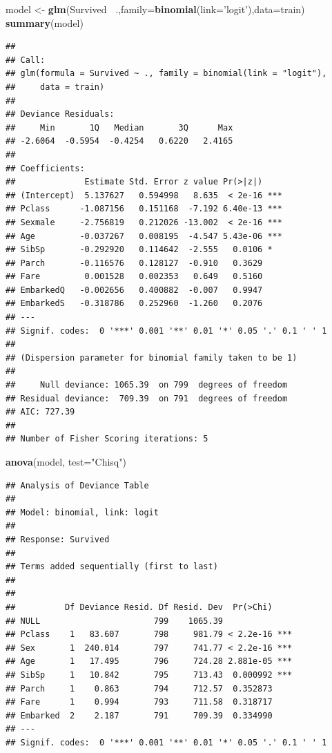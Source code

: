 \documentclass[]{book}
\newenvironment{Shaded}{\begin{snugshade}}{\end{snugshade}}
\newcommand{\KeywordTok}[1]{\textcolor[rgb]{0.13,0.29,0.53}{\textbf{#1}}}
\newcommand{\DataTypeTok}[1]{\textcolor[rgb]{0.13,0.29,0.53}{#1}}
\newcommand{\StringTok}[1]{\textcolor[rgb]{0.31,0.60,0.02}{#1}}
\newcommand{\OperatorTok}[1]{\textcolor[rgb]{0.81,0.36,0.00}{\textbf{#1}}}
\newcommand{\NormalTok}[1]{#1}
\begin{document}
\begin{Shaded}
\begin{Highlighting}[]
\NormalTok{model <-}\StringTok{ }\KeywordTok{glm}\NormalTok{(Survived }\OperatorTok{~}\NormalTok{.,}\DataTypeTok{family=}\KeywordTok{binomial}\NormalTok{(}\DataTypeTok{link=}\StringTok{'logit'}\NormalTok{),}\DataTypeTok{data=}\NormalTok{train)}
\KeywordTok{summary}\NormalTok{(model)}
\end{Highlighting}
\end{Shaded}

\begin{verbatim}
## 
## Call:
## glm(formula = Survived ~ ., family = binomial(link = "logit"), 
##     data = train)
## 
## Deviance Residuals: 
##     Min       1Q   Median       3Q      Max  
## -2.6064  -0.5954  -0.4254   0.6220   2.4165  
## 
## Coefficients:
##              Estimate Std. Error z value Pr(>|z|)    
## (Intercept)  5.137627   0.594998   8.635  < 2e-16 ***
## Pclass      -1.087156   0.151168  -7.192 6.40e-13 ***
## Sexmale     -2.756819   0.212026 -13.002  < 2e-16 ***
## Age         -0.037267   0.008195  -4.547 5.43e-06 ***
## SibSp       -0.292920   0.114642  -2.555   0.0106 *  
## Parch       -0.116576   0.128127  -0.910   0.3629    
## Fare         0.001528   0.002353   0.649   0.5160    
## EmbarkedQ   -0.002656   0.400882  -0.007   0.9947    
## EmbarkedS   -0.318786   0.252960  -1.260   0.2076    
## ---
## Signif. codes:  0 '***' 0.001 '**' 0.01 '*' 0.05 '.' 0.1 ' ' 1
## 
## (Dispersion parameter for binomial family taken to be 1)
## 
##     Null deviance: 1065.39  on 799  degrees of freedom
## Residual deviance:  709.39  on 791  degrees of freedom
## AIC: 727.39
## 
## Number of Fisher Scoring iterations: 5
\end{verbatim}

\begin{Shaded}
\begin{Highlighting}[]
\KeywordTok{anova}\NormalTok{(model, }\DataTypeTok{test=}\StringTok{"Chisq"}\NormalTok{)}
\end{Highlighting}
\end{Shaded}

\begin{verbatim}
## Analysis of Deviance Table
## 
## Model: binomial, link: logit
## 
## Response: Survived
## 
## Terms added sequentially (first to last)
## 
## 
##          Df Deviance Resid. Df Resid. Dev  Pr(>Chi)    
## NULL                       799    1065.39              
## Pclass    1   83.607       798     981.79 < 2.2e-16 ***
## Sex       1  240.014       797     741.77 < 2.2e-16 ***
## Age       1   17.495       796     724.28 2.881e-05 ***
## SibSp     1   10.842       795     713.43  0.000992 ***
## Parch     1    0.863       794     712.57  0.352873    
## Fare      1    0.994       793     711.58  0.318717    
## Embarked  2    2.187       791     709.39  0.334990    
## ---
## Signif. codes:  0 '***' 0.001 '**' 0.01 '*' 0.05 '.' 0.1 ' ' 1
\end{verbatim}
\end{document}
